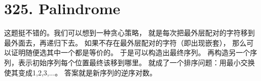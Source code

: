 \section{325. Palindrome}
这题挺不错的。我们可以想到一种贪心策略，
就是每次把最外层配对的字符移到最外面去，再递归下去。
如果不存在最外层配对的字符（即出现嵌套），
那么可以证明随便选其中一个都是等价的。
于是可以构造出最终序列。
再构造另一个序列，表示初始序列每个位置最终该移到哪里。
就成了一个排序问题：用最小交换使其变成{1,2,3,...}。
答案就是新序列的逆序对数。
